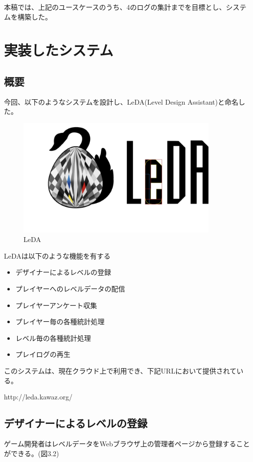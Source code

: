 本稿では、上記のユースケースのうち、4のログの集計までを目標とし、システムを構築した。

\section{実装したシステム}

\subsection{概要}
今回、以下のようなシステムを設計し、LeDA(Level Design Assistant)と命名した。

\begin{figure}[htbp]
  \begin{center}
    \includegraphics[bb=0 0 956 566, width=10cm]{images/logo.png}
  \end{center}
  \caption{LeDA}
  \label{fig:one}
\end{figure}

LeDAは以下のような機能を有する

\begin{itemize}
  \item デザイナーによるレベルの登録
  \item プレイヤーへのレベルデータの配信
  \item プレイヤーアンケート収集
  \item プレイヤー毎の各種統計処理
  \item レベル毎の各種統計処理
  \item プレイログの再生
\end{itemize}

このシステムは、現在クラウド上で利用でき、下記URLにおいて提供されている。

http://leda.kawaz.org/

\subsection{デザイナーによるレベルの登録}
ゲーム開発者はレベルデータをWebブラウザ上の管理者ページから登録することができる。(図3.2)

